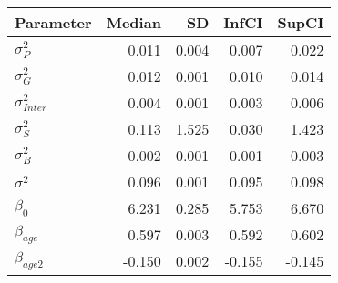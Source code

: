 \begin{table}[ht]
\centering
\begin{tabular}{lrrrr}
  \hline
Parameter & Median & SD & InfCI & SupCI \\ 
  \hline
$\sigma^{2}_{P}$ & 0.011 & 0.004 & 0.007 & 0.022 \\ 
  $\sigma^{2}_{G}$ & 0.012 & 0.001 & 0.010 & 0.014 \\ 
  $\sigma^{2}_{Inter}$ & 0.004 & 0.001 & 0.003 & 0.006 \\ 
  $\sigma^{2}_{S}$ & 0.113 & 1.525 & 0.030 & 1.423 \\ 
  $\sigma^{2}_{B}$ & 0.002 & 0.001 & 0.001 & 0.003 \\ 
  $\sigma^{2}$ & 0.096 & 0.001 & 0.095 & 0.098 \\ 
  $\beta_{0}$ & 6.231 & 0.285 & 5.753 & 6.670 \\ 
  $\beta_{age}$ & 0.597 & 0.003 & 0.592 & 0.602 \\ 
  $\beta_{age2}$ & -0.150 & 0.002 & -0.155 & -0.145 \\ 
   \hline
\end{tabular}
\end{table}
